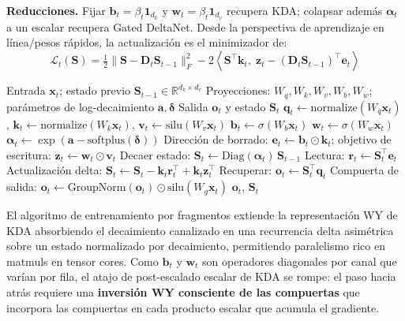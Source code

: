 \textbf{Reducciones.} Fijar $\mathbf{b}_t = \beta_t \mathbf{1}_{d_k}$ y $\mathbf{w}_t = \beta_t \mathbf{1}_{d_v}$ recupera KDA; colapsar además $\boldsymbol{\alpha}_t$ a un escalar recupera Gated DeltaNet. Desde la perspectiva de aprendizaje en línea/pesos rápidos, la actualización es el minimizador de:
\[
\mathcal{L}_t(\mathbf{S}) = \tfrac{1}{2}\|\mathbf{S} - \mathbf{D}_t \mathbf{S}_{t-1}\|_F^2 - 2\left\langle \mathbf{S}^\top \mathbf{k}_t,\; \mathbf{z}_t - (\mathbf{D}_t \mathbf{S}_{t-1})^\top \mathbf{e}_t \right\rangle
\]

\begin{algorithm}[H]
\caption{Avance Recurrente de Gated DeltaNet-2 (Forma de Referencia)}
\begin{algorithmic}[1]
\Require Entrada $\mathbf{x}_t$; estado previo $\mathbf{S}_{t-1} \in \mathbb{R}^{d_k \times d_v}$
\Require Proyecciones: $W_q, W_k, W_v, W_b, W_w$; parámetros de log-decaimiento $\mathbf{a}, \boldsymbol{\delta}$
\Ensure Salida $\mathbf{o}_t$ y estado $\mathbf{S}_t$
\State $\mathbf{q}_t \gets \mathrm{normalize}(W_q \mathbf{x}_t)$, $\mathbf{k}_t \gets \mathrm{normalize}(W_k \mathbf{x}_t)$, $\mathbf{v}_t \gets \mathrm{silu}(W_v \mathbf{x}_t)$
\State $\mathbf{b}_t \gets \sigma(W_b \mathbf{x}_t)$ 
\State $\mathbf{w}_t \gets \sigma(W_w \mathbf{x}_t)$ 
\State $\boldsymbol{\alpha}_t \gets \exp(\mathbf{a} - \mathrm{softplus}(\boldsymbol{\delta}))$ 
\State Dirección de borrado: $\mathbf{e}_t \gets \mathbf{b}_t \odot \mathbf{k}_t$; objetivo de escritura: $\mathbf{z}_t \gets \mathbf{w}_t \odot \mathbf{v}_t$
\State Decaer estado: $\mathbf{S}_t \gets \mathrm{Diag}(\boldsymbol{\alpha}_t)\, \mathbf{S}_{t-1}$
\State Lectura: $\mathbf{r}_t \gets \mathbf{S}_t^\top \mathbf{e}_t$ 
\State Actualización delta: $\mathbf{S}_t \gets \mathbf{S}_t - \mathbf{k}_t \mathbf{r}_t^\top + \mathbf{k}_t \mathbf{z}_t^\top$
\State Recuperar: $\mathbf{o}_t \gets \mathbf{S}_t^\top \mathbf{q}_t$
\State Compuerta de salida: $\mathbf{o}_t \gets \mathrm{GroupNorm}(\mathbf{o}_t) \odot \mathrm{silu}(W_g \mathbf{x}_t)$
\State \Return $\mathbf{o}_t$, $\mathbf{S}_t$
\end{algorithmic}
\end{algorithm}

El algoritmo de entrenamiento por fragmentos extiende la representación WY de KDA absorbiendo el decaimiento canalizado en una recurrencia delta asimétrica sobre un estado normalizado por decaimiento, permitiendo paralelismo rico en matmuls en tensor cores. Como $\mathbf{b}_t$ y $\mathbf{w}_t$ son operadores diagonales por canal que varían por fila, el atajo de post-escalado escalar de KDA se rompe: el paso hacia atrás requiere una \textbf{inversión WY consciente de las compuertas} que incorpora las compuertas en cada producto escalar que acumula el gradiente.


